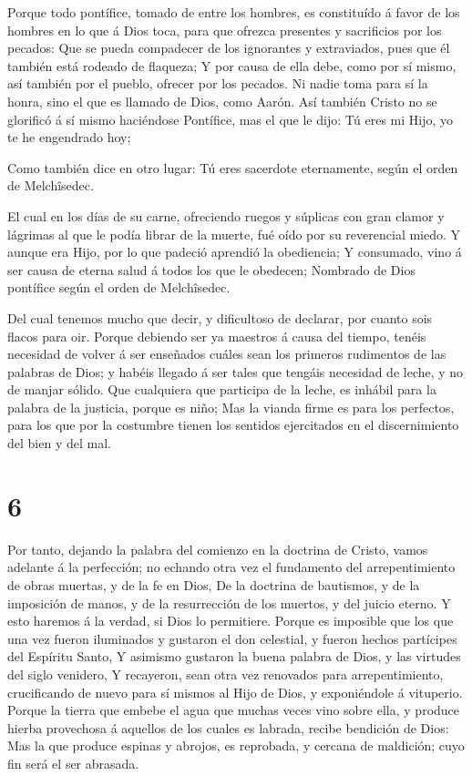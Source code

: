  Porque todo pontífice, tomado de entre los hombres, es
constituído á favor de los hombres en lo que á Dios toca, para que
ofrezca presentes y sacrificios por los pecados:  Que se
pueda compadecer de los ignorantes y extraviados, pues que él también
está rodeado de flaqueza;  Y por causa de ella debe, como
por sí mismo, así también por el pueblo, ofrecer por los pecados.
 Ni nadie toma para sí la honra, sino el que es llamado de
Dios, como Aarón.  Así también Cristo no se glorificó á sí
mismo haciéndose Pontífice, mas el que le dijo: Tú eres mi Hijo, yo te
he engendrado hoy;

 Como también dice en otro lugar: Tú eres sacerdote
eternamente, según el orden de Melchîsedec.

 El cual en los días de su carne, ofreciendo ruegos y
súplicas con gran clamor y lágrimas al que le podía librar de la muerte,
fué oído por su reverencial miedo.  Y aunque era Hijo, por
lo que padeció aprendió la obediencia;  Y consumado, vino á
ser causa de eterna salud á todos los que le obedecen; 
Nombrado de Dios pontífice según el orden de Melchîsedec.

 Del cual tenemos mucho que decir, y dificultoso de
declarar, por cuanto sois flacos para oir.  Porque debiendo
ser ya maestros á causa del tiempo, tenéis necesidad de volver á ser
enseñados cuáles sean los primeros rudimentos de las palabras de Dios; y
habéis llegado á ser tales que tengáis necesidad de leche, y no de
manjar sólido.  Que cualquiera que participa de la leche,
es inhábil para la palabra de la justicia, porque es niño; 
Mas la vianda firme es para los perfectos, para los que por la costumbre
tienen los sentidos ejercitados en el discernimiento del bien y del mal.

\hypertarget{section-5}{%
\section{6}\label{section-5}}

 Por tanto, dejando la palabra del comienzo en la doctrina
de Cristo, vamos adelante á la perfección; no echando otra vez el
fundamento del arrepentimiento de obras muertas, y de la fe en Dios,
 De la doctrina de bautismos, y de la imposición de manos, y
de la resurrección de los muertos, y del juicio eterno.  Y
esto haremos á la verdad, si Dios lo permitiere.  Porque es
imposible que los que una vez fueron iluminados y gustaron el don
celestial, y fueron hechos partícipes del Espíritu Santo,  Y
asimismo gustaron la buena palabra de Dios, y las virtudes del siglo
venidero,  Y recayeron, sean otra vez renovados para
arrepentimiento, crucificando de nuevo para sí mismos al Hijo de Dios, y
exponiéndole á vituperio.  Porque la tierra que embebe el
agua que muchas veces vino sobre ella, y produce hierba provechosa á
aquellos de los cuales es labrada, recibe bendición de Dios:
 Mas la que produce espinas y abrojos, es reprobada, y
cercana de maldición; cuyo fin será el ser abrasada.

